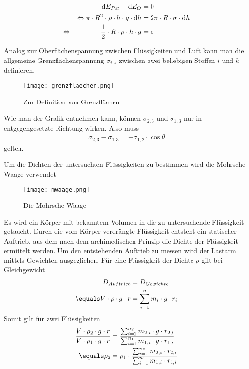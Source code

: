 \documentclass[12pt, a4paper, twoside]{scrartcl}
\begin{document}
\begin{align}
\textup dE_{Pot}+\textup dE_{O}&=0 \nonumber\\
\Leftrightarrow\pi\cdot R^2\cdot\rho\cdot h \cdot g\cdot\textup dh&=2\pi\cdot R\cdot\sigma\cdot\textup dh \nonumber\\
\Leftrightarrow\hspace{1.5cm} \frac{1}{2}\cdot R\cdot\rho\cdot h\cdot g&=\sigma \label{eq:oberflaechenspannung}
\end{align}\newline

Analog zur Oberflächenspannung zwischen Flüssigkeiten und Luft kann man die allgemeine Grenzflächenspannung $\sigma_{i,k}$ zwischen zwei beliebigen Stoffen $i$ und $k$ definieren.
\begin{figure} [h]
\centering
\texttt{[image: grenzflaechen.png]}
\caption{Zur Definition von Grenzflächen\protect\footnotemark}
\end{figure}

Wie man der Grafik entnehmen kann, können $\sigma_{2,3}$ und $\sigma_{1,3}$ nur in entgegengesetzte Richtung wirken. Also muss
\begin{align*}
 \sigma_{2,3}-\sigma_{1,3}=-\sigma_{1,2}\cdot\cos\theta
\end{align*}
gelten.\newline

Um die Dichten der untersuchten Flüssigkeiten zu bestimmen wird die Mohrsche Waage verwendet.

\begin{figure} [h]
\centering
\texttt{[image: mwaage.png]}
\caption{Die Mohrsche Waage\protect\footnotemark}
\end{figure}

Es wird ein Körper mit bekanntem Volumen in die zu untersuchende Flüssigkeit getaucht. Durch die vom Körper verdrängte Flüssigkeit entsteht ein statischer Auftrieb, aus dem nach dem archimedischen Prinzip die Dichte der Flüssigkeit ermittelt werden. Um den entstehenden Auftrieb zu messen wird der Lastarm mittels Gewichten ausgeglichen.
Für eine Flüssigkeit der Dichte $\rho$ gilt bei Gleichgewicht
\begin{align}
 D_{Auftrieb} &= D_{Gewichte} \nonumber\\
\equals  V\cdot\rho\cdot g \cdot r &= \sum_{i=1}^{n}m_i\cdot g\cdot r_i
\end{align}
Somit gilt für zwei Flüssigkeiten
\begin{align}
\frac{V\cdot\rho_2\cdot g \cdot r}{V\cdot\rho_1\cdot g \cdot r} &= \frac{\sum_{i=1}^{n_2}m_{2,i}\cdot g\cdot r_{2,i}}{\sum_{i=1}^{n_1}m_{1,i}\cdot g\cdot r_{1,i}} \nonumber\\
\equals \rho_2 &= \rho_1 \cdot \frac{\sum_{i=1}^{n_2}m_{2,i}\cdot r_{2,i}}{\sum_{i=1}^{n_1}m_{1,i}\cdot r_{1,i}} \label{eq:mohrsche_waage}
\end{align}
\end{document}
